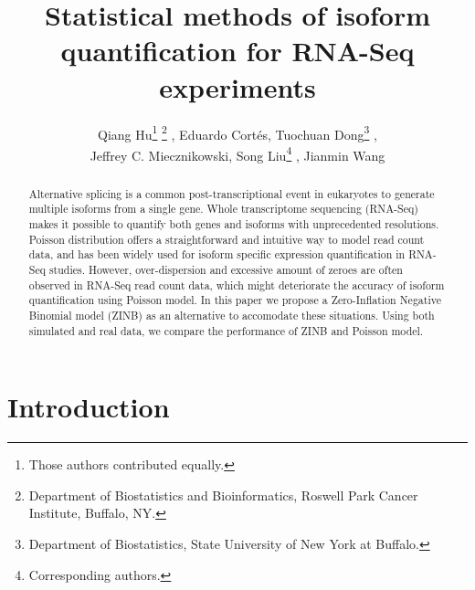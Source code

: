 \documentclass[11pt]{article}
\begin{document}
\title{Statistical methods of isoform quantification for RNA-Seq experiments}
\author{Qiang Hu\thanks{Those authors contributed equally.} \thanks{Department of Biostatistics and Bioinformatics, Roswell Park Cancer Institute, Buffalo, NY.} , Eduardo Cort\'es\footnotemark[1] \footnotemark[2] , Tuochuan Dong\thanks{Department of Biostatistics, State University of New York at Buffalo.} , \\ Jeffrey C. Miecznikowski\footnotemark[3] , Song Liu\footnotemark[1] \footnote{Corresponding authors.} , Jianmin Wang\footnotemark[1] \footnotemark[4]}
\date{}

\maketitle
\begin{abstract}
\noindent Alternative splicing is a common post-transcriptional event in eukaryotes to generate multiple isoforms from a single gene. Whole transcriptome sequencing (RNA-Seq) makes it possible to quantify both genes and isoforms with unprecedented resolutions. 
Poisson distribution offers a straightforward and intuitive way to model read count data, and has been widely used for isoform specific expression quantification in RNA-Seq studies. 
However, over-dispersion and excessive amount of zeroes are often observed in RNA-Seq read count data, which might deteriorate the accuracy of isoform quantification using Poisson model. In this paper we propose a Zero-Inflation Negative Binomial model (ZINB) as an alternative to accomodate these situations. Using both simulated and real data, we compare the performance of ZINB and Poisson model. 


\end{abstract}
\newpage
\tableofcontents
\newpage
\section{Introduction}
\end{document}
